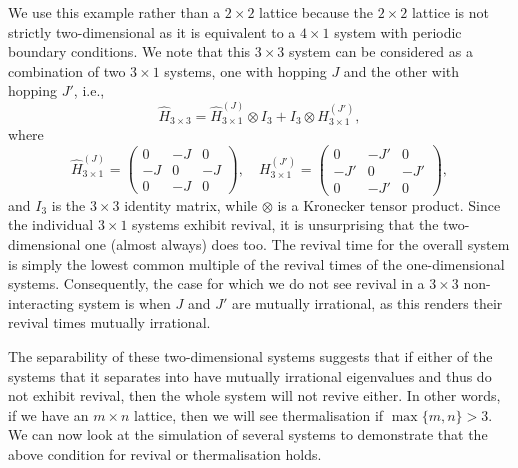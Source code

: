 \documentclass[prb, twocolumn, final]{revtex4-1}
\theoremstyle{plain}
\begin{document}
We use this example rather than a $2 \times 2$ lattice because the $2 \times 2$
lattice is not strictly two-dimensional as it is equivalent to a $4 \times 1$
system with periodic boundary conditions. We note that this $3 \times 3$ system
can be considered as a combination of two $3 \times 1$ systems, one with hopping
$J$ and the other with hopping $J'$, i.e.,
\begin{equation}
 \hat{H}_{3 \times 3}
 =
 \hat{H}_{3 \times 1}^{(J)} \otimes {I}_{3}  +
 {I}_{3} \otimes H_{3 \times 1}^{(J')},
\end{equation}
where
\begin{equation}
    \hat{H}_{3\times1}^{(J)}
    =
    \begin{pmatrix}
         0 & -J &  0 \\
        -J &  0 & -J \\
         0 & -J &  0
    \end{pmatrix},
    \quad
    H_{3\times1}^{(J')}
    =
    \begin{pmatrix}
         0 & -J' &  0  \\
        -J' &  0 & -J' \\
         0 & -J' &  0
    \end{pmatrix},
\end{equation}
and $I_{3}$ is the $3 \times 3$ identity matrix, while $\otimes$ is a Kronecker
tensor product. Since the individual $3 \times 1$ systems exhibit revival, it is
unsurprising that the two-dimensional one (almost always) does too. The revival
time for the overall system is simply the lowest common multiple of the revival
times of the one-dimensional systems. Consequently, the case for which we do
not see revival in a $3\times3$ non-interacting system is when $J$ and $J'$ are
mutually irrational, as this renders their revival times mutually irrational.

The separability of these two-dimensional systems suggests that if either of the
systems that it separates into have mutually irrational eigenvalues and thus do
not exhibit revival, then the whole system will not revive either. In other
words, if we have an $m \times n$ lattice, then we will see thermalisation if
$\max{\lbrace m,n \rbrace} > 3$. We can now look at the simulation of several
systems to demonstrate that the above condition for revival or thermalisation
holds.
\end{document}
